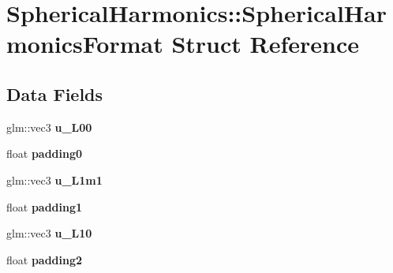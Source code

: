 \hypertarget{struct_spherical_harmonics_1_1_spherical_harmonics_format}{}\section{Spherical\+Harmonics\+:\+:Spherical\+Harmonics\+Format Struct Reference}
\label{struct_spherical_harmonics_1_1_spherical_harmonics_format}
\subsection*{Data Fields}
\begin{DoxyCompactItemize}
\item 
glm\+::vec3 {\bfseries u\+\_\+\+L00}\hypertarget{struct_spherical_harmonics_1_1_spherical_harmonics_format_a720c4bf23641691e867e3abf84983e7a}{}\label{struct_spherical_harmonics_1_1_spherical_harmonics_format_a720c4bf23641691e867e3abf84983e7a}

\item 
float {\bfseries padding0}\hypertarget{struct_spherical_harmonics_1_1_spherical_harmonics_format_a6c9b61438b50e874c42f77ca457bc14c}{}\label{struct_spherical_harmonics_1_1_spherical_harmonics_format_a6c9b61438b50e874c42f77ca457bc14c}

\item 
glm\+::vec3 {\bfseries u\+\_\+\+L1m1}\hypertarget{struct_spherical_harmonics_1_1_spherical_harmonics_format_a7f704a91db098935651e031b70209af9}{}\label{struct_spherical_harmonics_1_1_spherical_harmonics_format_a7f704a91db098935651e031b70209af9}

\item 
float {\bfseries padding1}\hypertarget{struct_spherical_harmonics_1_1_spherical_harmonics_format_af3d6a0d23c5396345b46512a0ea14ad3}{}\label{struct_spherical_harmonics_1_1_spherical_harmonics_format_af3d6a0d23c5396345b46512a0ea14ad3}

\item 
glm\+::vec3 {\bfseries u\+\_\+\+L10}\hypertarget{struct_spherical_harmonics_1_1_spherical_harmonics_format_a740f808c83b84d9b565fef56f9cc2352}{}\label{struct_spherical_harmonics_1_1_spherical_harmonics_format_a740f808c83b84d9b565fef56f9cc2352}

\item 
float {\bfseries padding2}\hypertarget{struct_spherical_harmonics_1_1_spherical_harmonics_format_ad84cbfeac6903d9fd678383c1217b947}{}\label{struct_spherical_harmonics_1_1_spherical_harmonics_format_ad84cbfeac6903d9fd678383c1217b947}


\end{DoxyCompactItemize}
